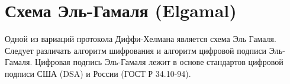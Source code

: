\section{Схема Эль-Гамаля (Elgamal)}
Одной из вариаций протокола Диффи-Хелмана является схема Эль
Гамаля. Следует различать алгоритм шифрования и алгоритм цифровой
подписи Эль-Гамаля. Цифровая подпись Эль-Гамаля лежит в основе
стандартов цифровой подписи США (DSA) и России (ГОСТ Р 34.10-94).
